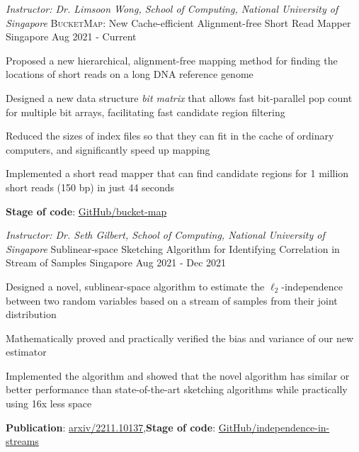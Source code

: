 

\begin{cventries}

  \cventry
    {\it Instructor: Dr. Limsoon Wong, School of Computing, National University of Singapore} %
    {\textsc{BucketMap}: New Cache-efficient Alignment-free Short Read Mapper} %
    {Singapore} %
    {Aug 2021 - Current} %
    {
      \begin{cvitems} %
        \item {Proposed a new hierarchical, alignment-free mapping method for finding the locations of short reads on a long DNA reference genome}
        \item {Designed a new data structure \textit{bit matrix} that allows fast bit-parallel pop count for multiple bit arrays, facilitating fast candidate region filtering}
        \item {Reduced the sizes of index files so that they can fit in the cache of ordinary computers, and significantly speed up mapping}
        \item {Implemented a short read mapper that can find candidate regions for 1 million short reads (150 bp) in just 44 seconds}
        \item {\textbf{Stage of code}: \href{https://github.com/GZHoffie/bucket-map}{GitHub/bucket-map}}
      \end{cvitems}
    }


  \cventry
    {\it Instructor: Dr. Seth Gilbert, School of Computing, National University of Singapore} %
    {Sublinear-space Sketching Algorithm for Identifying Correlation in Stream of Samples} %
    {Singapore} %
    {Aug 2021 - Dec 2021} %
    {
      \begin{cvitems} %
      \item {Designed a novel, sublinear-space algorithm to estimate the $\ell_2$-independence between two random variables based on a stream of samples from their joint distribution}
    \item {Mathematically proved and practically verified the bias and variance of our new estimator}
    \item {Implemented the algorithm and showed that the novel algorithm has similar or better performance than state-of-the-art sketching algorithms while practically using 16x less space}
        \item {\textbf{Publication}: \href{https://arxiv.org/abs/2211.10137}{arxiv/2211.10137},\qquad \textbf{Stage of code}: \href{https://github.com/GZHoffie/independence-in-streams}{GitHub/independence-in-streams}}
      \end{cvitems}
    }



\end{cventries}
